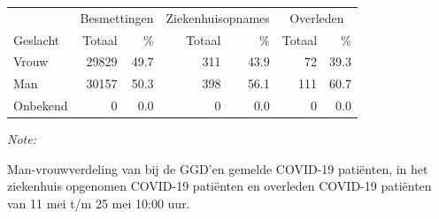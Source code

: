 \documentclass[
  english,
  man,floatsintext]{apa6}
\begin{document}
\begin{table}
\centering\begingroup\fontsize{11}{13}\selectfont

\begin{threeparttable}
\begin{tabular}{lrrrrrr}
\toprule
\multicolumn{1}{c}{ } & \multicolumn{2}{c}{Besmettingen} & \multicolumn{2}{c}{Ziekenhuisopnames} & \multicolumn{2}{c}{Overleden} \\
\cmidrule(l{3pt}r{3pt}){2-3} \cmidrule(l{3pt}r{3pt}){4-5} \cmidrule(l{3pt}r{3pt}){6-7}
Geslacht & Totaal & \% & Totaal & \% & Totaal & \%\\
\midrule
Vrouw & 29829 & 49.7 & 311 & 43.9 & 72 & 39.3\\
Man & 30157 & 50.3 & 398 & 56.1 & 111 & 60.7\\
Onbekend & 0 & 0.0 & 0 & 0.0 & 0 & 0.0\\
\bottomrule
\end{tabular}
\begin{tablenotes}
\item \textit{Note: } 
\item Man-vrouwverdeling van bij de GGD’en gemelde COVID-19 patiënten, in het ziekenhuis opgenomen COVID-19 patiënten en overleden COVID-19 patiënten van 11 mei t/m 25 mei 10:00 uur.
\end{tablenotes}
\end{threeparttable}
\endgroup{}
\end{table}
\newpage
\end{document}
